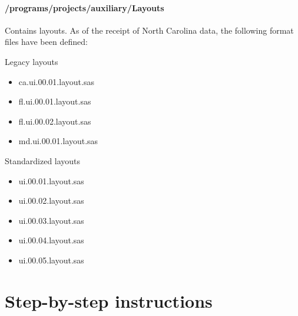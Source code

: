 \paragraph{/programs/projects/auxiliary/Layouts}

Contains layouts. As of the receipt of North Carolina data, the following
format files have been defined:

\begin{description}
\item Legacy layouts
\begin{itemize}
\item ca.ui.00.01.layout.sas
\item fl.ui.00.01.layout.sas
\item fl.ui.00.02.layout.sas
\item md.ui.00.01.layout.sas
\end{itemize}
\item Standardized layouts
\begin{itemize}
\item ui.00.01.layout.sas
\item ui.00.02.layout.sas
\item ui.00.03.layout.sas
\item ui.00.04.layout.sas
\item ui.00.05.layout.sas
\end{itemize}
\end{description}

\section{Step-by-step instructions}
\label{app:ui_step_by_step}

